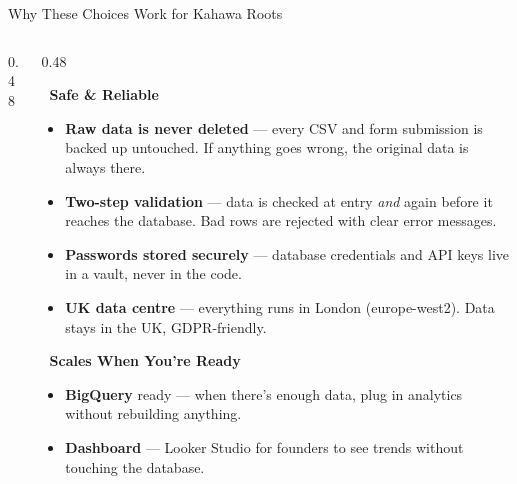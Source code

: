 \documentclass[aspectratio=169]{beamer}
\begin{document}
\begin{frame}{Why These Choices Work for Kahawa Roots}
\begin{columns}[T]
\begin{column}{0.48\textwidth}
\end{column}

\begin{column}{0.48\textwidth}

\textbf{\faShieldAlt\ Safe \& Reliable}
\vspace{0.1em}

\begin{itemize}\setlength{\itemsep}{3pt}
    \item \textbf{\textcolor{kahawaBrown}{Raw data is never deleted}} — every CSV and form submission is backed up untouched. If anything goes wrong, the original data is always there.

    \item \textbf{\textcolor{kahawaBrown}{Two-step validation}} — data is checked at entry \textit{and} again before it reaches the database. Bad rows are rejected with clear error messages.

    \item \textbf{\textcolor{kahawaBrown}{Passwords stored securely}} — database credentials and API keys live in a vault, never in the code.

    \item \textbf{\textcolor{kahawaBrown}{UK data centre}} — everything runs in London (europe-west2). Data stays in the UK, GDPR-friendly.
\end{itemize}

\vspace{0.1em}
\textbf{\faChartLine\ Scales When You're Ready}
\vspace{0.1em}

\begin{itemize}\setlength{\itemsep}{3pt}
    \item \textbf{\textcolor{kahawaBrown}{BigQuery}} ready — when there's enough data, plug in analytics without rebuilding anything.

    \item \textbf{\textcolor{kahawaBrown}{Dashboard}} — Looker Studio for founders to see trends without touching the database.
\end{itemize}

\end{column}

\end{columns}

\end{frame}
\end{document}
